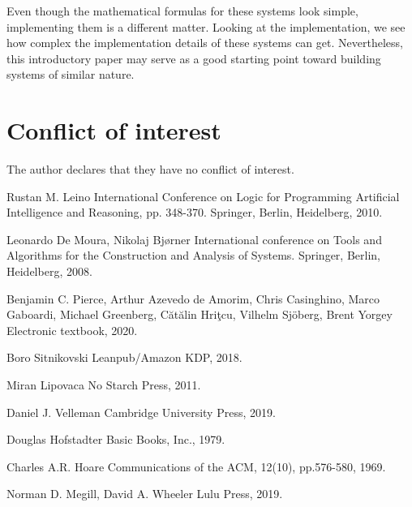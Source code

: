 \documentclass{article}
\begin{document}
Even though the mathematical formulas for these systems look simple, implementing them is a different matter. Looking at the implementation, we see how complex the implementation details of these systems can get. Nevertheless, this introductory paper may serve as a good starting point toward building systems of similar nature.

\section{Conflict of interest}

The author declares that they have no conflict of interest.

\begin{thebibliography}{1}

Rustan M. Leino
\newblock International Conference on Logic for Programming Artificial Intelligence and Reasoning, pp. 348-370. Springer, Berlin, Heidelberg, 2010.

Leonardo De Moura, Nikolaj Bjørner
\newblock International conference on Tools and Algorithms for the Construction and Analysis of Systems. Springer, Berlin, Heidelberg, 2008.

Benjamin C. Pierce, Arthur Azevedo de Amorim, Chris Casinghino, Marco Gaboardi, Michael Greenberg, Cătălin Hriţcu, Vilhelm Sjöberg, Brent Yorgey
\newblock Electronic textbook, 2020.

Boro Sitnikovski
\newblock Leanpub/Amazon KDP, 2018.

Miran Lipovaca
\newblock No Starch Press, 2011.

Daniel J. Velleman
\newblock Cambridge University Press, 2019.

Douglas Hofstadter
\newblock Basic Books, Inc., 1979.

Charles A.R. Hoare
\newblock Communications of the ACM, 12(10), pp.576-580, 1969.

Norman D. Megill, David A. Wheeler
\newblock Lulu Press, 2019.

\end{thebibliography}
\end{document}
